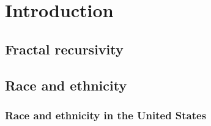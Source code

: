 \chapter{Introduction}
  \section{Fractal recursivity}
  \section{Race and ethnicity}
    \subsection{Race and ethnicity in the United States}
